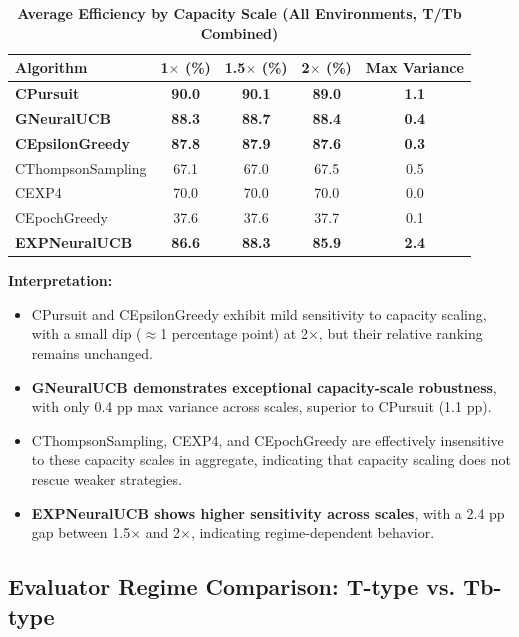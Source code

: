 \documentclass[12pt,a4paper]{article}
\newcommand{\performance}[1]{\textcolor{performancecolor}{\textbf{#1}}}
\newcommand{\legacy}[1]{\textcolor{legacycolor}{\textbf{#1}}}
\newcommand{\neural}[1]{\textcolor{neuralcolor}{\textbf{#1}}}
\begin{document}
\begin{table}[H]
\centering
\caption{\performance{Average Efficiency by Capacity Scale (All Environments, T/Tb Combined)}}
\begin{tabular}{|l|c|c|c|c|}
\hline
\textbf{Algorithm} & \textbf{1$\times$ (\%)} & \textbf{1.5$\times$ (\%)} & \textbf{2$\times$ (\%)} & \textbf{Max Variance} \\
\hline
\hline
\performance{CPursuit}        & \performance{90.0} & \performance{90.1} & \performance{89.0} & \performance{1.1} \\
\neural{GNeuralUCB}          & \neural{88.3} & \neural{88.7} & \neural{88.4} & \neural{0.4} \\
\performance{CEpsilonGreedy} & \performance{87.8} & \performance{87.9} & \performance{87.6} & \performance{0.3} \\
CThompsonSampling            & 67.1              & 67.0              & 67.5 & 0.5 \\
CEXP4                        & 70.0              & 70.0              & 70.0 & 0.0 \\
CEpochGreedy                 & 37.6              & 37.6              & 37.7 & 0.1 \\
\legacy{EXPNeuralUCB}        & \legacy{86.6}     & \legacy{88.3}     & \legacy{85.9} & \legacy{2.4} \\
\hline
\end{tabular}
\end{table}

\textbf{Interpretation:}
\begin{itemize}
\item CPursuit and CEpsilonGreedy exhibit mild sensitivity to capacity scaling, with a small dip ($\approx$1 percentage point) at 2$\times$, but their relative ranking remains unchanged.
\item \neural{GNeuralUCB demonstrates exceptional capacity-scale robustness}, with only 0.4 pp max variance across scales, superior to CPursuit (1.1 pp).
\item CThompsonSampling, CEXP4, and CEpochGreedy are effectively insensitive to these capacity scales in aggregate, indicating that capacity scaling does not rescue weaker strategies.
\item \legacy{EXPNeuralUCB shows higher sensitivity across scales}, with a 2.4 pp gap between 1.5$\times$ and 2$\times$, indicating regime-dependent behavior.
\end{itemize}

\subsection{Evaluator Regime Comparison: T-type vs. Tb-type}
\end{document}
